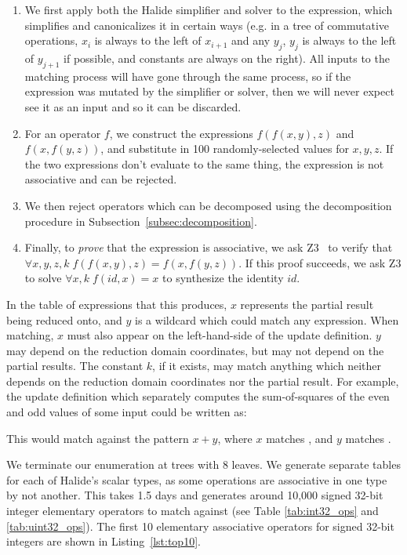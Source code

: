 \begin{enumerate}
\item We first apply both the Halide simplifier and solver to the expression, which simplifies and canonicalizes it in certain ways (e.g. in a tree of commutative operations, $x_i$ is always to the left of $x_{i+1}$ and any $y_j$, $y_j$ is always to the left of $y_{j+1}$  if possible, and constants are always on the right). All inputs to the matching process will have gone through the same process, so if the expression was mutated by the simplifier or solver, then we will never expect see it as an input and so it can be discarded.
\item For an operator $f$, we construct the expressions $f(f(x, y), z)$ and $f(x, f(y, z))$, and substitute in 100 randomly-selected values for $x, y, z$. If the two expressions don't evaluate to the same thing, the expression is not associative and can be rejected.
\item We then reject operators which can be decomposed using the decomposition procedure in Subsection~\ref{subsec:decomposition}.
\item Finally, to \emph{prove} that the expression is associative, we ask Z3~\cite{DeMoura:2008:ZES:1792734.1792766} to verify that $\forall x, y, z, k \;f(f(x, y), z) = f(x, f(y, z))$. If this proof succeeds, we ask Z3 to solve $\forall x, k \;f(id, x) = x$ to synthesize the identity $id$.
\end{enumerate}

In the table of expressions that this produces, $x$ represents the partial result being reduced onto, and $y$ is a wildcard which could match any expression. When matching, $x$ must also appear on the left-hand-side of the update definition. $y$ may depend on the reduction domain coordinates, but may not depend on the partial results. The constant $k$, if it exists, may match anything which neither depends on the reduction domain coordinates nor the partial result. For example, the update definition which separately computes the sum-of-squares of the even and odd values of some input  could be written as:


This would match against the pattern $x + y$, where $x$ matches , and $y$ matches .

We terminate our enumeration at trees with 8 leaves. We generate separate tables for each of Halide's scalar types, as some operations are associative in one type by not another. This takes 1.5 days and generates around 10,000 signed 32-bit integer elementary operators to match against (see Table \ref{tab:int32_ops} and \ref{tab:uint32_ops}). The first 10 elementary associative operators for signed 32-bit integers are shown in Listing~\ref{lst:top10}.

